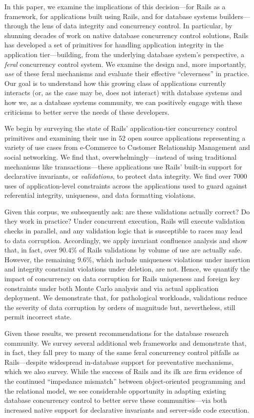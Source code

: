In this paper, we examine the implications of this decision---for
Rails as a framework, for applications built using Rails, and for
database systems builders---through the lens of data integrity and
concurrency control. In particular, by shunning decades of work on
native database concurrency control solutions, Rails has developed a
set of primitives for handling application integrity in the
application tier---building, from the underlying database system's
perspective, a \textit{feral} concurrency control system. We examine
the design and, more importantly, \textit{use} of these feral
mechanisms and evaluate their effective ``cleverness'' in
practice. Our goal is to understand how this growing class of
applications currently interacts (or, as the case may be, does not
interact) with database systems and how we, as a database systems
community, we can positively engage with these criticisms to better
serve the needs of these developers.

We begin by surveying the state of Rails' application-tier concurrency
control primitives and examining their use in 52 open source
applications representing a variety of use cases from e-Commerce to
Customer Relationship Management and social networking. We find that,
overwhelmingly---instead of using traditional mechanisms like
transactions---these applications use Rails' built-in support for
declarative invariants, or \textit{validations}, to protect data
integrity. We find over $7000$ uses of application-level constraints
across the applications used to guard against referential integrity,
uniqueness, and data formatting violations.

Given this corpus, we subsequently ask: are these validations actually
correct? Do they work in practice? Under concurrent execution, Rails
will execute validation checks in parallel, and any validation logic
that is susceptible to races may lead to data corruption. Accordingly,
we apply invariant confluence analysis and show that, in fact, over
$90.4\%$ of Rails validations by volume of use are actually
safe. However, the remaining $9.6\%$, which include uniqueness
violations under insertion and integrity constraint violations under
deletion, are not. Hence, we quantify the impact of concurrency on
data corruption for Rails uniqueness and foreign key constraints under
both Monte Carlo analysis and via actual application deployment. We
demonstrate that, for pathological workloads, validations reduce the
severity of data corruption by orders of magnitude but, nevertheless,
still permit incorrect state.

Given these results, we present recommendations for the
database research community. We survey several additional web
frameworks and demonstrate that, in fact, they fall prey to many of
the same feral concurrency control pitfalls as Rails---despite
widespread in-database support for preventative mechanisms, which we
also survey. While the success of Rails and its ilk are firm evidence
of the continued ``impedance mismatch'' between object-oriented
programming and the relational model, we see considerable opportunity
in adapting existing database concurrency control to better serve
these communities---via both increased native support for declarative invariants
and server-side code execution.